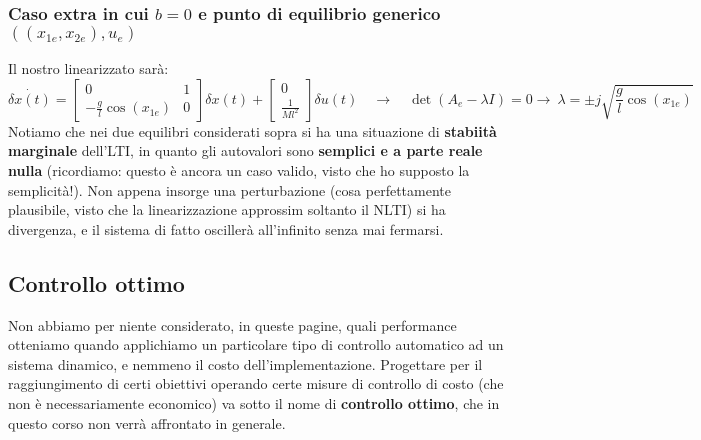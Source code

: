 \documentclass[a4paper]{report}
\begin{document}
\begin{esem}
\subsubsection{Caso extra in cui $b = 0$ e punto di equilibrio generico $((x_{1e},x_{2e}),u_e)$}
Il nostro linearizzato sarà:
\begin{equation*}
	\dot{\delta x(t)} = \begin{bmatrix}
 0 & 1 \\ -\frac{g}{l}\cos(x_{1e}) & 0	
 \end{bmatrix} \delta x(t) + \begin{bmatrix}
 	0 \\ \frac{1}{Ml^2}
 \end{bmatrix} \delta u(t) \quad \rightarrow \quad 
	\det(A_e - \lambda I) = 0 \rightarrow \ \lambda = \pm j \sqrt{\frac{g}{l}  \cos(x_{1e})} 
\end{equation*}
Notiamo che nei due equilibri considerati sopra si ha una situazione di \textbf{stabiità marginale} dell'LTI, in quanto gli autovalori sono \textbf{semplici e a parte reale nulla} (ricordiamo: questo è ancora un caso valido, visto che ho supposto la semplicità!). Non appena insorge una perturbazione (cosa perfettamente plausibile, visto che la linearizzazione approssim soltanto il NLTI) si ha divergenza, e il sistema di fatto oscillerà all'infinito senza mai fermarsi. 
\end{esem}

\subsection{Controllo ottimo}
Non abbiamo per niente considerato, in queste pagine, quali performance otteniamo quando applichiamo un particolare tipo di controllo automatico ad un sistema dinamico, e nemmeno il costo dell'implementazione. Progettare per il raggiungimento di certi obiettivi operando certe misure di controllo di costo (che non è necessariamente economico) va sotto il nome di \textbf{controllo ottimo}, che in questo corso non verrà affrontato in generale.


\end{document}

